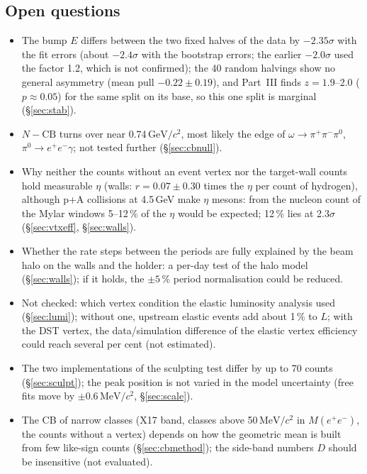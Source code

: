 \documentclass[11pt,a4paper]{article}
\newcommand{\piz}{\ensuremath{\pi^{0}}\xspace}
\newcommand{\ee}{\ensuremath{e^{+}e^{-}}\xspace}
\newcommand{\pipi}{\ensuremath{\pi^{+}\pi^{-}}\xspace}
\newcommand{\Mee}{\ensuremath{M(e^{+}e^{-})}\xspace}
\newcommand{\GeVcc}{\ensuremath{\mathrm{GeV}/c^{2}}\xspace}
\newcommand{\MeVcc}{\ensuremath{\mathrm{MeV}/c^{2}}\xspace}
\begin{document}
\subsection{Open questions}
\label{sec:openq}
\begin{itemize}
\setlength{\itemsep}{0pt}
\item The bump $E$ differs between the two fixed halves of the data by $-2.35\sigma$ with the fit errors (about $-2.4\sigma$ with the
      bootstrap errors; the earlier $-2.0\sigma$ used the factor 1.2, which is not confirmed); the 40 random halvings show no general asymmetry
      (mean pull $-0.22\pm0.19$), and Part~III finds $z=1.9$--2.0 ($p\approx0.05$) for the same split on its base, so this one split is
      marginal (\S\ref{sec:stab}).
\item $N-\mathrm{CB}$ turns over near 0.74\,\GeVcc, most likely the edge of $\omega\to\pipi\piz$, $\piz\to\ee\gamma$; not tested
      further (\S\ref{sec:cbnull}).
\item Why neither the counts without an event vertex nor the target-wall counts hold measurable $\eta$ (walls: $r=0.07\pm0.30$ times the
      $\eta$ per count of hydrogen), although p+A collisions at 4.5\,GeV make $\eta$ mesons: from the nucleon count of the Mylar windows
      5--12\,\% of the $\eta$ would be expected; 12\,\% lies at 2.3$\sigma$ (\S\ref{sec:vtxeff}, \S\ref{sec:walls}).
\item Whether the rate steps between the periods are fully explained by the beam halo on the walls and the holder: a per-day test of the
      halo model (\S\ref{sec:walls}); if it holds, the $\pm5$\,\% period normalisation could be reduced.
\item Not checked: which vertex condition the elastic luminosity analysis used (\S\ref{sec:lumi}); without one, upstream elastic events
      add about 1\,\% to $L$; with the DST vertex, the data/simulation difference of the elastic vertex efficiency could reach several
      per cent (not estimated).
\item The two implementations of the sculpting test differ by up to 70 counts (\S\ref{sec:sculpt}); the peak position is not varied in
      the model uncertainty (free fits move by $\pm0.6$\,\MeVcc, \S\ref{sec:scale}).
\item The CB of narrow classes (X17 band, classes above 50\,\MeVcc in \Mee, the counts without a vertex) depends on how the geometric mean
      is built from few like-sign counts (\S\ref{sec:cbmethod}); the side-band numbers $D$ should be insensitive (not evaluated).

\end{itemize}
\end{document}
